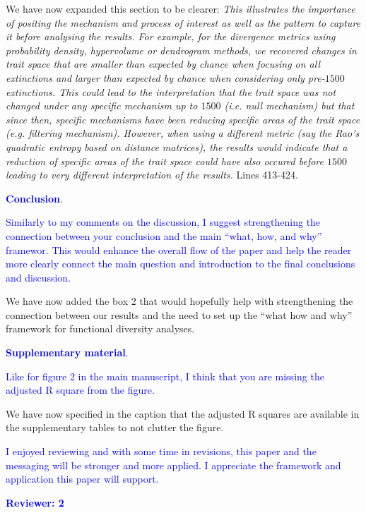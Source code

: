 \documentclass[
]{article}
\begin{document}
We have now expanded this section to be clearer:
\textit{This illustrates the importance of positing the mechanism and process of interest as well as the pattern to capture it before analysing the results.
For example, for the divergence metrics using probability density, hypervolume or dendrogram methods, we recovered changes in trait space that are smaller than expected by chance when focusing on all extinctions and larger than expected by chance when considering only pre-$1500$ extinctions.
This could lead to the interpretation that the trait space was not changed under any specific mechanism up to $1500$ (i.e. null mechanism) but that since then, specific mechanisms have been reducing specific areas of the trait space (e.g. filtering mechanism).
However, when using a different metric (say the Rao's quadratic entropy based on distance matrices), the results would indicate that a reduction of specific areas of the trait space could have also occured before $1500$ leading to very different interpretation of the results.}
Lines 413-424.

\textcolor{blue}{\textbf{Conclusion}.}

\textcolor{blue}{Similarly to my comments on the discussion, I suggest strengthening the connection between your conclusion and the main ``what, how, and why'' framewor.
This would enhance the overall flow of the paper and help the reader more clearly connect the main question and introduction to the final conclusions and discussion.}

We have now added the box 2 that would hopefully help with strengthening the connection between our results and the need to set up the ``what how and why'' framework for functional diversity analyses.

\textcolor{blue}{\textbf{Supplementary material}.}

\textcolor{blue}{Like for figure 2 in the main manuscript, I think that you are missing the adjusted R square from the figure.}

We have now specified in the caption that the adjusted R squares are available in the supplementary tables to not clutter the figure.

\textcolor{blue}{I enjoyed reviewing and with some time in revisions, this paper and the messaging will be stronger and more applied. I appreciate the framework and application this paper will support.}

\textcolor{blue}{\textbf{Reviewer: 2}}
\end{document}
